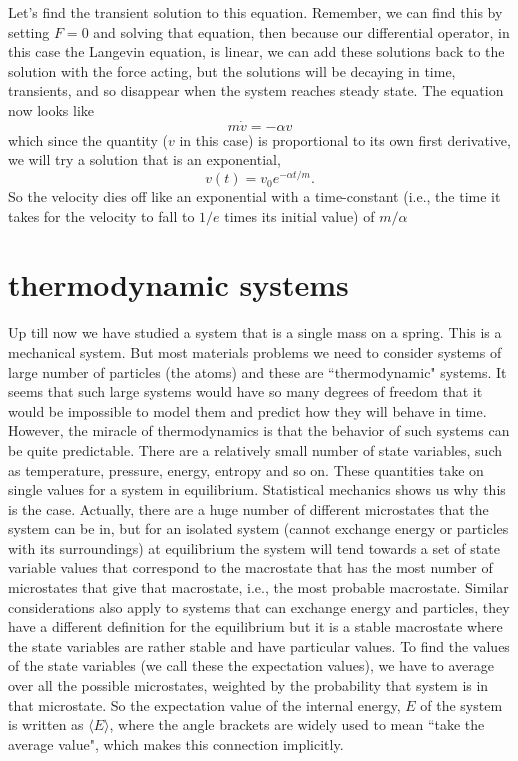 \documentclass[]{revtex4}
\newcommand{\sm}[1]{{\[#1\]}}
\begin{document}
Let's find the transient solution to this equation.  Remember, we can find this by setting $F=0$ and solving that equation, then
because our differential operator, in this case the Langevin equation, is linear, we can add these solutions back to the solution
with the force acting, but the solutions will be decaying in time, transients, and so disappear when the system reaches steady state.
The equation now looks like
\sm{m\dot{v}=-\alpha v}
which since the quantity ($v$ in this case) is proportional to its own first derivative, we will try a solution that is an
exponential,
\sm{v(t)=v_0 e^{-\alpha t/m}.}
So the velocity dies off like an exponential with a time-constant (i.e., the time it takes for the velocity to fall to $1/e$ times its initial value)
of $m/\alpha$

\section*{thermodynamic systems}
Up till now we have studied a system that is a single mass on a spring.  This is a mechanical system.  But most materials problems we need to
consider systems of large number of particles (the atoms) and these are ``thermodynamic" systems.  It seems that such large systems would
have so many degrees of freedom that it would be impossible to model them and predict how they will behave in time.  However, the miracle of
thermodynamics is that the behavior of such systems can be quite predictable.  There are a relatively small number of state variables,
such as temperature, pressure, energy, entropy and so on.  These quantities take on single values for a system in equilibrium.  Statistical
mechanics shows us why this is the case.  Actually, there are a huge number of different microstates that the system can be in, but for an
isolated system (cannot exchange energy or particles with its surroundings) at equilibrium
the system will tend towards a set of state variable values that correspond to the macrostate that has the most number of
microstates that give that macrostate, i.e., the most probable macrostate.  Similar considerations also apply to systems that can exchange
energy and particles, they have a different definition for the equilibrium but it is a stable macrostate where the state variables are rather
stable and have particular values.  To find the values of the state variables (we call these the expectation values), we have to average over all the possible microstates, weighted
by the probability that system is in that microstate.  So the expectation value of the internal energy, $E$ of the system is written as $\langle E\rangle$,
where the angle brackets are widely used to mean ``take the average value", which makes this connection implicitly.
\end{document}
